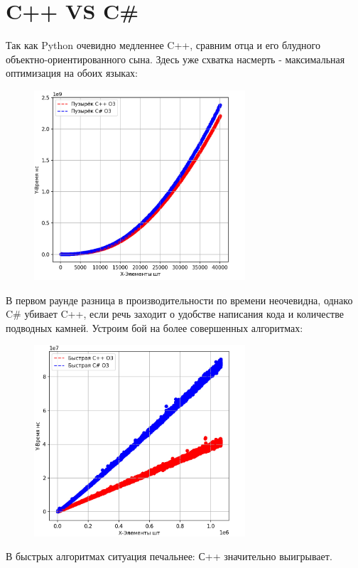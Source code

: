 \documentclass[a4paper,12pt]{article} %
\begin{document}
\section{C++ VS C\#}
Так как Python очевидно медленнее C++, сравним отца и его блудного объектно-ориентированного сына. Здесь уже схватка насмерть - максимальная оптимизация на обоих языках:
\begin{figure}[H]
    \centering
    \includegraphics[width=0.7\textwidth]{img/last/compsl.jpg}
\end{figure} 
В первом раунде разница в производительности по времени неочевидна, однако C\# убивает C++, если речь заходит о удобстве написания кода и количестве подводных камней. Устроим бой на более совершенных алгоритмах:
\begin{figure}[H]
    \centering
    \includegraphics[width=0.7\textwidth]{img/last/compqw.jpg}
\end{figure} 
В быстрых алгоритмах ситуация печальнее: С++ значительно выигрывает.
\end{document}
